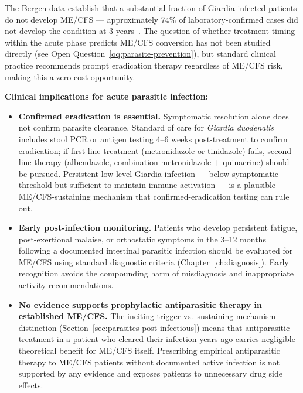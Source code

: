 The Bergen data establish that a substantial fraction of Giardia-infected patients do not develop ME/CFS --- approximately 74\% of laboratory-confirmed cases did not develop the condition at 3 years~\cite{Wensaas2012giardia5yr}. The question of whether treatment timing within the acute phase predicts ME/CFS conversion has not been studied directly (see Open Question~\ref{oq:parasite-prevention}), but standard clinical practice recommends prompt eradication therapy regardless of ME/CFS risk, making this a zero-cost opportunity.

\textbf{Clinical implications for acute parasitic infection:}

\begin{itemize}
  \item \textbf{Confirmed eradication is essential.} Symptomatic resolution alone does not confirm parasite clearance. Standard of care for \emph{Giardia duodenalis} includes stool PCR or antigen testing 4--6 weeks post-treatment to confirm eradication; if first-line treatment (metronidazole or tinidazole) fails, second-line therapy (albendazole, combination metronidazole + quinacrine) should be pursued. Persistent low-level Giardia infection --- below symptomatic threshold but sufficient to maintain immune activation --- is a plausible ME/CFS-sustaining mechanism that confirmed-eradication testing can rule out.

  \item \textbf{Early post-infection monitoring.} Patients who develop persistent fatigue, post-exertional malaise, or orthostatic symptoms in the 3--12 months following a documented intestinal parasitic infection should be evaluated for ME/CFS using standard diagnostic criteria (Chapter~\ref{ch:diagnosis}). Early recognition avoids the compounding harm of misdiagnosis and inappropriate activity recommendations.

  \item \textbf{No evidence supports prophylactic antiparasitic therapy in established ME/CFS.} The inciting trigger vs.\ sustaining mechanism distinction (Section~\ref{sec:parasites-post-infectious}) means that antiparasitic treatment in a patient who cleared their infection years ago carries negligible theoretical benefit for ME/CFS itself. Prescribing empirical antiparasitic therapy to ME/CFS patients without documented active infection is not supported by any evidence and exposes patients to unnecessary drug side effects.
\end{itemize}

